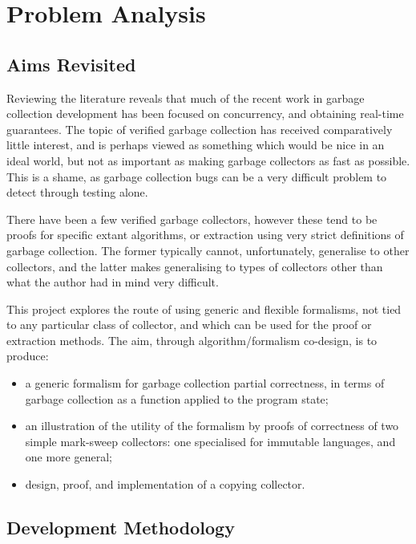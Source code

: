 \chapter{Problem Analysis}
\label{sec:analysis}

\section{Aims Revisited}
\label{sec:analysis-aims}

Reviewing the literature reveals that much of the recent work in
garbage collection development has been focused on concurrency, and
obtaining real-time guarantees. The topic of verified garbage
collection has received comparatively little interest, and is perhaps
viewed as something which would be nice in an ideal world, but not as
important as making garbage collectors as fast as possible. This is a
shame, as garbage collection bugs can be a very difficult problem to
detect through testing alone.

There have been a few verified garbage collectors, however these tend
to be proofs for specific extant algorithms, or extraction using very
strict definitions of garbage collection. The former typically cannot,
unfortunately, generalise to other collectors, and the latter makes
generalising to types of collectors other than what the author had in
mind very difficult.

This project explores the route of using generic and flexible
formalisms, not tied to any particular class of collector, and which
can be used for the proof or extraction methods. The aim, through
algorithm/formalism co-design, is to produce:

\begin{itemize}
  \item a generic formalism for garbage collection partial
    correctness, in terms of garbage collection as a function applied
    to the program state;

  \item an illustration of the utility of the formalism by proofs of
    correctness of two simple mark-sweep collectors: one specialised
    for immutable languages, and one more general;

  \item design, proof, and implementation of a copying collector.
\end{itemize}

\section{Development Methodology}
\label{sec:analysis-development}

